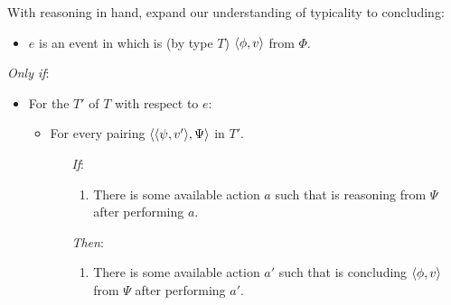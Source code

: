 \begin{note}
  With reasoning in hand, expand our understanding of typicality to concluding:

  \begin{definition}[\tC{2}]
    \label{def:tC}

    \noindent%

    \begin{itemize}
    \item
      \(e\) is an event in which \vAgent{} is \emph{} (by type \(T\)) \(\langle \phi, v \rangle\) from \(\Phi\).
    \end{itemize}

    \emph{Only if}:

    \begin{itemize}[noitemsep]
    \item
      For the  \(T'\) of \(T\) with respect to \(e\):
      \begin{itemize}[noitemsep]
      \item
        For every pairing \(\langle \langle \psi, v' \rangle, \Psi \rangle\) in \(T'\).
        \begin{itemize}[noitemsep]
        \item[\emph{If}:]
          \begin{enumerate}[label=\alph*., ref=(\alph*), series=tRSketch]
          \item
            There is some available action \(a\) such that \vAgent{} is reasoning from \(\Psi\) after performing \(a\).
          \end{enumerate}
        \item[\emph{Then}:]
          \begin{enumerate}[label=\alph*., ref=(\alph*), resume*=tRSketch]
          \item
            There is some available action \(a'\) such that \vAgent{} is concluding \(\langle \phi, v \rangle\) from \(\Psi\) after performing \(a'\).
          \end{enumerate}
        \end{itemize}
      \end{itemize}
    \end{itemize}
    \vspace{-\baselineskip}
  \end{definition}


\end{note}
